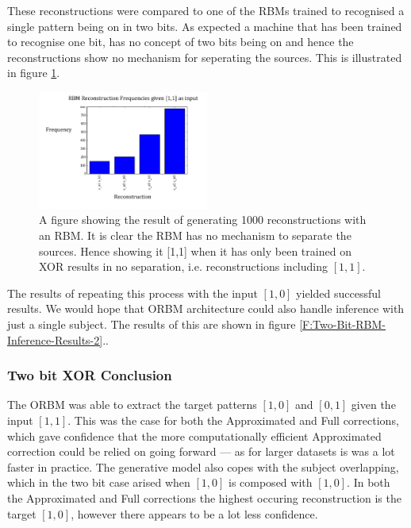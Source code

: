 These reconstructions were compared to one of the RBMs trained to recognised a single pattern being on in two bits. As expected a machine that has been trained to recognise one bit, has no concept of two bits being on and hence the reconstructions show no mechanism for seperating the sources. This is illustrated in figure \ref{F:Two-Bit-RBM-Inference-Results-1}.


\begin{figure}[h]
  \begin{center}
    \includegraphics[width=0.5\textwidth]{Assets/RBM-two-bit-XOR-Inference.png}
  \end{center}
  \caption{A figure showing the result of generating 1000 reconstructions with an RBM. It is clear the RBM has no mechanism to separate the sources. Hence showing it [1,1] when it has only been trained on XOR results in no separation, i.e. reconstructions including $[1,1]$.}

  \label{F:Two-Bit-RBM-Inference-Results-1}
\end{figure}

The results of repeating this process with the input $[1,0]$ yielded successful results. We would hope that ORBM architecture could also handle inference with just a single subject. The results of this are shown in
figure \ref{F:Two-Bit-RBM-Inference-Results-2}..

\subsubsection{Two bit XOR Conclusion}

The ORBM was able to extract the target patterns $[1,0]$ and $[0,1]$ given the input $[1,1]$. This was the case for both the Approximated and Full corrections, which gave confidence that the more computationally efficient Approximated correction could be relied on going forward --- as for larger datasets is was a lot faster in practice. The generative model also copes with the subject overlapping, which in the two bit case arised when $[1,0]$ is composed with $[1,0]$. In both the Approximated and Full corrections the highest occuring reconstruction is the target $[1,0]$, however there appears to be a lot less confidence.



